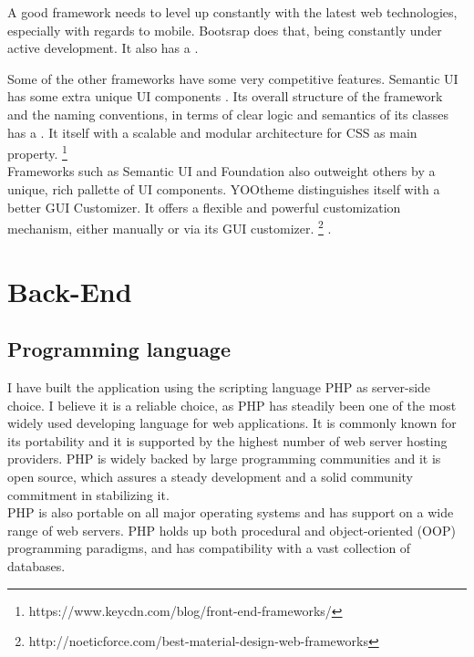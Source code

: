 A good framework needs to level up constantly with the latest web technologies, especially with regards to mobile. Bootsrap does that, being constantly under active development. It also has a .\\	

Some of the other frameworks have some very competitive features. Semantic UI has some extra unique UI components . Its overall structure of the framework and the naming conventions, in terms of clear logic and semantics of its classes has a . It  itself with a scalable and modular architecture for CSS as main property. \footnote{https://www.keycdn.com/blog/front-end-frameworks/}\\

Frameworks such as Semantic UI and Foundation also outweight others by a unique, rich pallette of UI components.
YOOtheme distinguishes itself with a better GUI Customizer. It offers a flexible and powerful customization mechanism, either manually or via its GUI customizer. \footnote{http://noeticforce.com/best-material-design-web-frameworks}
.\\


\section{Back-End}

\subsection{Programming language} 

I have built the application using the scripting language PHP as server-side choice. I believe it is a reliable choice, as PHP has steadily been one of the most widely used developing language for web applications. It is commonly known for its portability and it is supported by the highest number of web server hosting providers. 
PHP is widely backed by large programming communities and it is open source, which assures a steady development and a solid community commitment in stabilizing it.\\ 

PHP is also  portable on all major operating systems and has support on a wide range of web servers. PHP holds up both procedural and object-oriented (OOP) programming paradigms, and has compatibility with a vast collection of databases.\\ 

